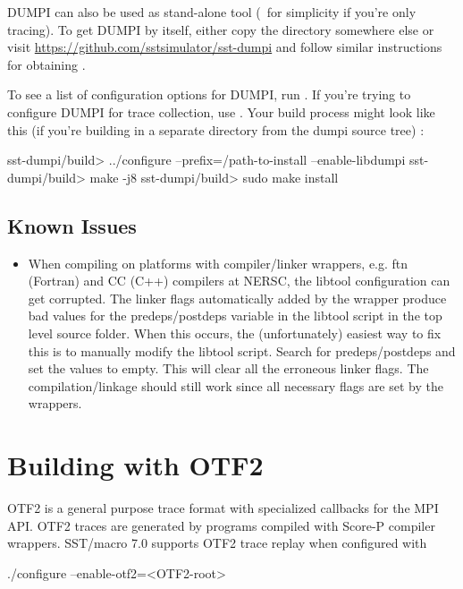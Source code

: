 DUMPI can also be used as stand-alone tool (\eg~for simplicity if you're only tracing). 
To get DUMPI by itself, either copy the  directory somewhere else or visit \url{https://github.com/sstsimulator/sst-dumpi} and follow similar instructions for obtaining \sstmacro.

To see a list of configuration options for DUMPI, run .  
If you're trying to configure DUMPI for trace collection, use .
Your build process might look like this (if you're building in a separate directory from the dumpi source tree) :

\begin{ShellCmd}
sst-dumpi/build> ../configure --prefix=/path-to-install --enable-libdumpi
sst-dumpi/build> make -j8
sst-dumpi/build> sudo make install
\end{ShellCmd}

\subsection{Known Issues}
\label{subsubsec:building:dumpi:issues}

\begin{itemize}
\item When compiling on platforms with compiler/linker wrappers, e.g. ftn (Fortran) and CC (C++) compilers 
at NERSC, the libtool configuration can get corrupted.  The linker flags automatically added by the 
wrapper produce bad values for the predeps/postdeps variable in the libtool script in the top 
level source folder.  When this occurs, the (unfortunately) easiest way to fix this is to manually modify
the libtool script.  Search for predeps/postdeps and set the values to empty.
This will clear all the erroneous linker flags.  The compilation/linkage should still work since 
all necessary flags are set by the wrappers. 
\end{itemize}

\section{Building with OTF2}
OTF2 is a general purpose trace format with specialized callbacks for the MPI API. OTF2 traces are generated by programs compiled with Score-P compiler wrappers. SST/macro 7.0 supports OTF2 trace replay when configured with 
\begin{ViFile}
./configure --enable-otf2=<OTF2-root>	
\end{ViFile}
\label{sec:buildingOtf2}

